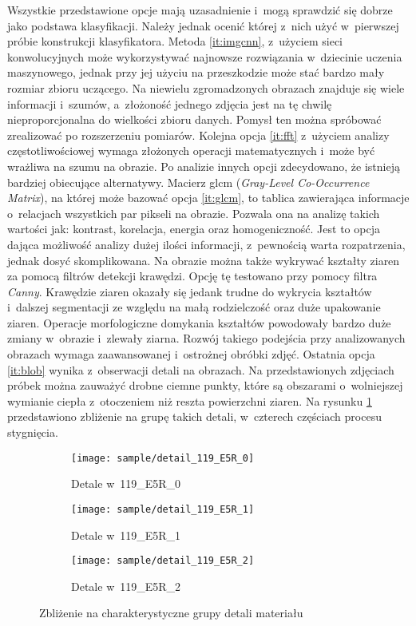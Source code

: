 Wszystkie przedstawione opcje mają uzasadnienie i~mogą sprawdzić się dobrze
jako podstawa klasyfikacji.
Należy jednak ocenić której z~nich użyć w~pierwszej próbie konstrukcji
klasyfikatora. Metoda \ref{it:imgcnn}, z~użyciem sieci konwolucyjnych może
wykorzystywać najnowsze rozwiązania w~dziecinie uczenia maszynowego,
jednak przy jej użyciu na przeszkodzie może stać bardzo mały rozmiar zbioru
uczącego.
Na niewielu zgromadzonych obrazach znajduje się wiele informacji i~szumów,
a~złożoność jednego zdjęcia jest na tę chwilę nieproporcjonalna do wielkości
zbioru danych.
Pomysł ten można spróbować zrealizować po rozszerzeniu pomiarów.
Kolejna opcja \ref{it:fft} z~użyciem analizy częstotliwościowej wymaga
złożonych operacji matematycznych i~może być wrażliwa na szumu na obrazie.
Po analizie innych opcji zdecydowano, że istnieją bardziej obiecujące
alternatywy.
Macierz glcm (\textit{Gray-Level Co-Occurrence Matrix}), na której może
bazować opcja \ref{it:glcm}, to tablica zawierająca informacje o~relacjach
wszystkich par pikseli na obrazie.
Pozwala ona na analizę takich wartości jak: kontrast, korelacja, energia
oraz homogeniczność.
Jest to opcja dająca możliwość analizy dużej ilości informacji, z~pewnością
warta rozpatrzenia, jednak dosyć skomplikowana.
Na obrazie można także wykrywać kształty ziaren za pomocą filtrów detekcji
krawędzi.
Opcję tę testowano przy pomocy filtra \emph{Canny}.
Krawędzie ziaren okazały się jedank trudne do wykrycia kształtów i~dalszej
segmentacji ze względu na małą rodzielczość oraz duże upakowanie ziaren.
Operacje morfologiczne domykania kształtów powodowały bardzo duże zmiany
w~obrazie i~zlewały ziarna.
Rozwój takiego podejścia przy analizowanych obrazach wymaga zaawansowanej
i~ostrożnej obróbki zdjęć.
Ostatnia opcja \ref{it:blob} wynika z~obserwacji detali na obrazach.
Na przedstawionych zdjęciach próbek można zauważyć drobne ciemne punkty,
które są obszarami o~wolniejszej wymianie ciepła z~otoczeniem niż reszta
powierzchni ziaren.
Na rysunku \ref{fig:blobdetail} przedstawiono zbliżenie na grupę takich
detali, w~czterech częściach procesu stygnięcia.
\begin{figure}[htbp]
	\centering
	\begin{subfigure}{0.3\textwidth}
		\centering
		\texttt{[image: sample/detail\_119\_E5R\_0]}
		\caption{Detale w~119\_E5R\_0}
	\end{subfigure}
	\hspace{0.25cm}
	\centering
	\begin{subfigure}{0.3\textwidth}
		\centering
		\texttt{[image: sample/detail\_119\_E5R\_1]}
		\caption{Detale w~119\_E5R\_1}
	\end{subfigure}
	\hspace{0.24cm}
	\begin{subfigure}{0.3\textwidth}
		\centering
		\texttt{[image: sample/detail\_119\_E5R\_2]}
		\caption{Detale w~119\_E5R\_2}
	\end{subfigure}
	\caption{Zbliżenie na charakterystyczne grupy detali materiału}
	\label{fig:blobdetail}
\end{figure}
